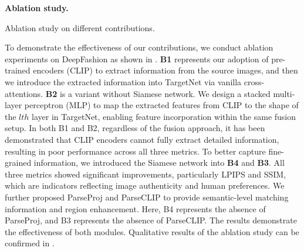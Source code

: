 \textbf{Ablation study.}
%
\begin{table}
    \centering
    \caption{Ablation study on different contributions.}
    \label{tab:ablation}
    \resizebox{1\linewidth}{!}{
    
    }
\end{table}
%
To demonstrate the effectiveness of our contributions, we conduct ablation experiments on DeepFashion as shown in . 
% 
\textbf{B1} represents our adoption of pre-trained encoders (\ie CLIP) to extract information from the source images, and then we introduce the extracted information into TargetNet via vanilla cross-attentions. 
%
\textbf{B2} is a variant without Siamese network. We design a stacked multi-layer perceptron (MLP) to map the extracted features from CLIP to the shape of the $lth$ layer in TargetNet, enabling feature incorporation within the same fusion setup.
%
In both B1 and B2, regardless of the fusion approach, it has been demonstrated that CLIP encoders cannot fully extract detailed information, resulting in poor performance across all three metrics. 
%
To better capture fine-grained information, we introduced the Siamese network into \textbf{B4} and \textbf{B3}. All three metrics showed significant improvements, particularly LPIPS and SSIM, which are indicators reflecting image authenticity and human preferences. 
We further proposed ParseProj and ParseCLIP to provide semantic-level matching information and region enhancement. Here, B4 represents the absence of ParseProj, and B3 represents the absence of ParseCLIP. The results demonstrate the effectiveness of both modules. Qualitative results of the ablation study can be confirmed in .

